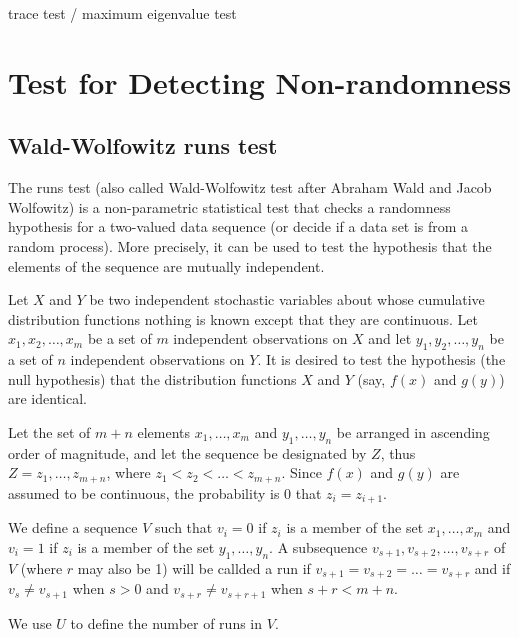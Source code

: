 trace test / maximum eigenvalue test

\section{Test for Detecting Non-randomness}


\subsection{Wald-Wolfowitz runs test}

The runs test (also called Wald-Wolfowitz test after Abraham Wald and Jacob Wolfowitz\cite{Wald_Wolfowitz_1940}) is a non-parametric statistical test that checks a randomness hypothesis for a two-valued data sequence (or decide if a data set is from a random process). More precisely, it can be used to test the hypothesis that the elements of the sequence are mutually independent.

Let $X$ and $Y$ be two independent stochastic variables about whose cumulative distribution functions nothing is known except that they are continuous. Let $x_1,x_2,\dots,x_m$ be a set of $m$ independent observations on $X$ and let $y_1,y_2,\dots,y_n$ be a set of $n$ independent observations on $Y$. It is desired to test the hypothesis (the null hypothesis) that the distribution functions $X$ and $Y$ (say, $f(x)$ and $g(y)$) are identical.

Let the set of $m+n$ elements $x_1,\dots,x_m$ and $y_1,\dots,y_n$ be arranged in ascending order of magnitude, and let the sequence be designated by $Z$, thus $Z= z_1,\dots,z_{m+n}$, where $z_1<z_2<\dots<z_{m+n}$.  Since $f(x)$ and $g(y)$ are assumed to be continuous, the probability is 0 that $z_i = z_{i+1}$. 

\begin{definition}\label{def:run_random_sequence}
We define a sequence $V$ such that $v_i = 0$ if $z_i$ is a member of the set $x_1,\dots,x_m$ and $v_i = 1$ if $z_i$ is a member of the set $y_1,\dots,y_n$. A subsequence $v_{s+1},v_{s+2},\dots,v_{s+r}$ of $V$ (where $r$ may also be 1) will be callded a run if $v_{s+1} = v_{s+2}= \dots = v_{s+r}$ and if $v_s\neq v_{s+1}$ when $s>0$ and $v_{s+r}\neq v_{s+r+1}$ when $s+r < m+n$. 

We use $U$ to define the number of runs in $V$.
\end{definition}


